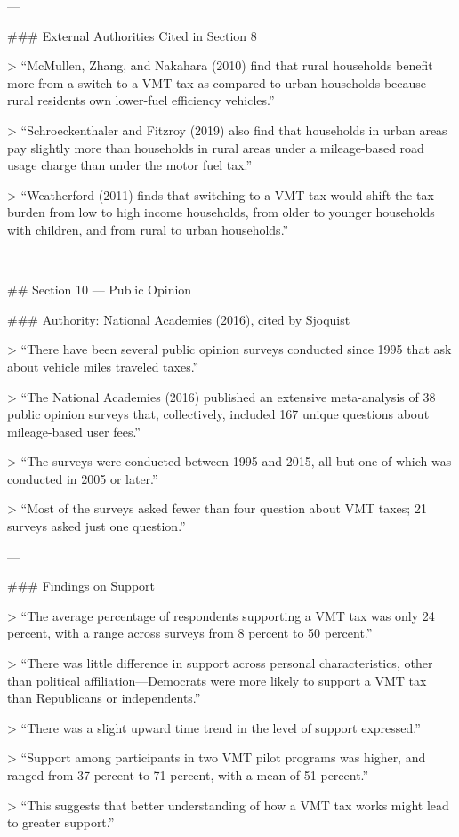 ---

### External Authorities Cited in Section 8

> “McMullen, Zhang, and Nakahara (2010) find that rural households benefit more from a switch to a VMT tax as compared to urban households because rural residents own lower-fuel efficiency vehicles.”

> “Schroeckenthaler and Fitzroy (2019) also find that households in urban areas pay slightly more than households in rural areas under a mileage-based road usage charge than under the motor fuel tax.”

> “Weatherford (2011) finds that switching to a VMT tax would shift the tax burden from low to high income households, from older to younger households with children, and from rural to urban households.”

---

## Section 10 — Public Opinion

### Authority: National Academies (2016), cited by Sjoquist

> “There have been several public opinion surveys conducted since 1995 that ask about vehicle miles traveled taxes.”

> “The National Academies (2016) published an extensive meta-analysis of 38 public opinion surveys that, collectively, included 167 unique questions about mileage-based user fees.”

> “The surveys were conducted between 1995 and 2015, all but one of which was conducted in 2005 or later.”

> “Most of the surveys asked fewer than four question about VMT taxes; 21 surveys asked just one question.”

---

### Findings on Support

> “The average percentage of respondents supporting a VMT tax was only 24 percent, with a range across surveys from 8 percent to 50 percent.”

> “There was little difference in support across personal characteristics, other than political affiliation—Democrats were more likely to support a VMT tax than Republicans or independents.”

> “There was a slight upward time trend in the level of support expressed.”

> “Support among participants in two VMT pilot programs was higher, and ranged from 37 percent to 71 percent, with a mean of 51 percent.”

> “This suggests that better understanding of how a VMT tax works might lead to greater support.”


